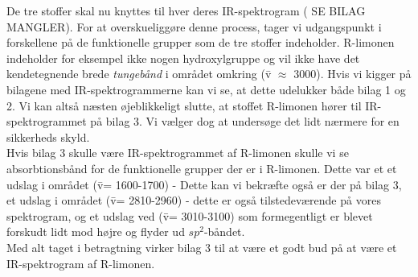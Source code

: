 De tre stoffer skal nu knyttes til hver deres IR-spektrogram ( SE BILAG MANGLER). For at overskueliggøre denne process, tager vi udgangspunkt i forskellene på de funktionelle grupper som de tre stoffer indeholder. R-limonen indeholder for eksempel ikke nogen hydroxylgruppe og vil ikke have det kendetegnende brede \emph{tungebånd} i området omkring (\={v} $\approx$ 3000). Hvis vi kigger på bilagene med IR-spektrogrammerne kan vi se, at dette udelukker både bilag 1 og 2. Vi kan altså næsten øjeblikkeligt slutte, at stoffet R-limonen hører til IR-spektrogrammet på bilag 3. Vi vælger dog at undersøge det lidt nærmere for en sikkerheds skyld. 
\\

Hvis bilag 3 skulle være IR-spektrogrammet af R-limonen skulle vi se absorbtionsbånd for de funktionelle grupper der er i R-limonen. Dette var  et et udslag i området (\={v}= 1600-1700) - Dette kan vi bekræfte også er der på bilag 3, et udslag i området (\={v}= 2810-2960) - dette er også tilstedeværende på vores spektrogram, og et udslag ved (\={v}= 3010-3100) som formegentligt er blevet forskudt lidt mod højre og flyder ud $sp^2$-båndet.
\\

Med alt taget i betragtning virker bilag 3 til at være et godt bud på at være et IR-spektrogram af R-limonen.

